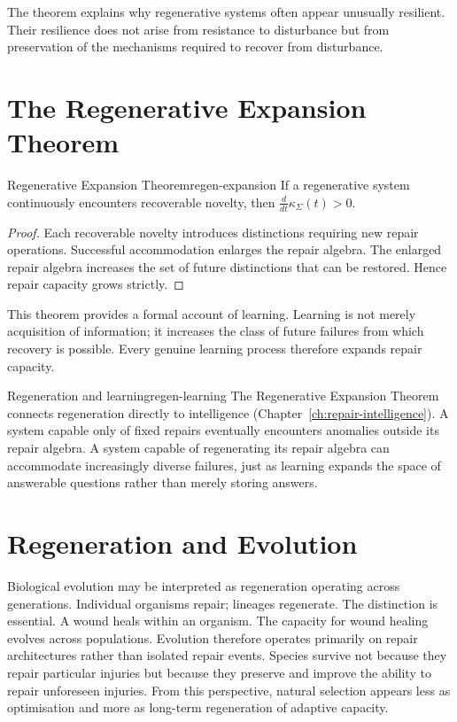 \documentclass[12pt,twoside,openright]{book}
\begin{document}
The theorem explains why regenerative systems often appear
unusually resilient. Their resilience does not arise from
resistance to disturbance but from preservation of the
mechanisms required to recover from disturbance.

\section{The Regenerative Expansion Theorem}
\label{sec:ch11-expansion}

\begin{theorem}{Regenerative Expansion Theorem}{regen-expansion}
  If a regenerative system continuously encounters
  recoverable novelty, then
  $\frac{d}{dt}\kappa_\Sigma(t) > 0$.
\end{theorem}

\begin{proof}
  Each recoverable novelty introduces distinctions
  requiring new repair operations. Successful accommodation
  enlarges the repair algebra. The enlarged repair algebra
  increases the set of future distinctions that can be
  restored. Hence repair capacity grows strictly.
\end{proof}

This theorem provides a formal account of learning.
Learning is not merely acquisition of information; it
increases the class of future failures from which recovery
is possible. Every genuine learning process therefore
expands repair capacity.

\begin{remark}{Regeneration and learning}{regen-learning}
  The Regenerative Expansion Theorem connects regeneration
  directly to intelligence (Chapter~\ref{ch:repair-intelligence}).
  A system capable only of fixed repairs eventually
  encounters anomalies outside its repair algebra. A system
  capable of regenerating its repair algebra can accommodate
  increasingly diverse failures, just as learning expands
  the space of answerable questions rather than merely
  storing answers.
\end{remark}

\section{Regeneration and Evolution}
\label{sec:ch11-evolution}

Biological evolution may be interpreted as regeneration
operating across generations. Individual organisms repair;
lineages regenerate. The distinction is essential. A wound
heals within an organism. The capacity for wound healing
evolves across populations. Evolution therefore operates
primarily on repair architectures rather than isolated
repair events. Species survive not because they repair
particular injuries but because they preserve and improve
the ability to repair unforeseen injuries. From this
perspective, natural selection appears less as optimisation
and more as long-term regeneration of adaptive capacity.
\end{document}
